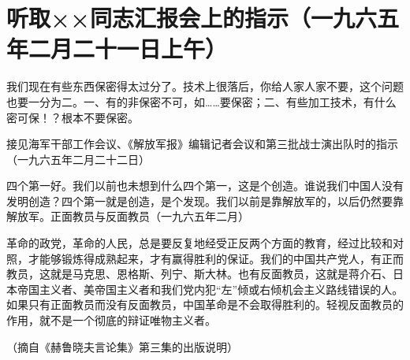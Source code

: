 \section[听取××同志汇报会上的指示（一九六五年二月二十一日上午）]{听取××同志汇报会上的指示（一九六五年二月二十一日上午）}


我们现在有些东西保密得太过分了。技术上很落后，你给人家人家不要，这个问题也要一分为二。一、有的非保密不可，如……要保密；二、有些加工技术，有什么密可保！？根本不要保密。

接见海军干部工作会议、《解放军报》编辑记者会议和第三批战士演出队时的指示（一九六五年二月二十二日）

四个第一好。我们以前也未想到什么四个第一，这是个创造。谁说我们中国人没有发明创造？四个第一就是创造，是个发现。我们以前是靠解放军的，以后仍然要靠解放军。正面教员与反面教员（一九六五年二月）

革命的政党，革命的人民，总是要反复地经受正反两个方面的教育，经过比较和对照，才能够锻炼得成熟起来，才有赢得胜利的保证。我们的中国共产党人，有正而教员，这就是马克思、恩格斯、列宁、斯大林。也有反面教员，这就是蒋介石、日本帝国主义者、美帝国主义者和我们党内犯“左”倾或右倾机会主义路线错误的人。如果只有正面教员而没有反面教员，中国革命是不会取得胜利的。轻视反面教员的作用，就不是一个彻底的辩证唯物主义者。

{\raggedleft （摘自《赫鲁晓夫言论集》第三集的出版说明）\par}


